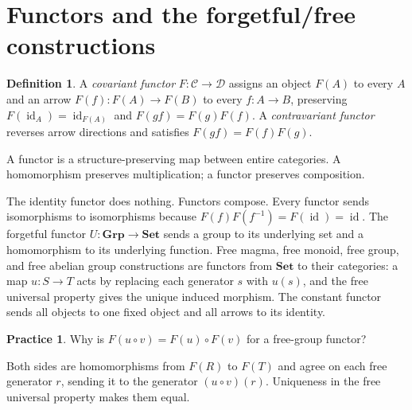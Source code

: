 \documentclass[11pt,openany]{book}
\newcommand{\id}{\operatorname{id}}\newcommand{\Sym}{\operatorname{Sym}}
\theoremstyle{definition}
\newtheorem{definition}[theorem]{Definition}
\newtheorem{exercise}[theorem]{Practice}
\begin{document}
\section{Functors and the forgetful/free constructions}
\begin{definition}A \emph{covariant functor} $F:\mathcal C\to\mathcal D$ assigns an object $F(A)$ to every $A$ and an arrow $F(f):F(A)\to F(B)$ to every $f:A\to B$, preserving $F(\id_A)=\id_{F(A)}$ and $F(gf)=F(g)F(f)$. A \emph{contravariant functor} reverses arrow directions and satisfies $F(gf)=F(f)F(g)$.\end{definition}
\begin{intuition}A functor is a structure-preserving map between entire categories. A homomorphism preserves multiplication; a functor preserves composition.\end{intuition}
The identity functor does nothing. Functors compose. Every functor sends isomorphisms to isomorphisms because $F(f)F(f^{-1})=F(\id)=\id$. The forgetful functor $U:\mathbf{Grp}\to\mathbf{Set}$ sends a group to its underlying set and a homomorphism to its underlying function. Free magma, free monoid, free group, and free abelian group constructions are functors from $\mathbf{Set}$ to their categories: a map $u:S\to T$ acts by replacing each generator $s$ with $u(s)$, and the free universal property gives the unique induced morphism. The constant functor sends all objects to one fixed object and all arrows to its identity.
\begin{exercise}Why is $F(u\circ v)=F(u)\circ F(v)$ for a free-group functor?\end{exercise}
\begin{solution}Both sides are homomorphisms from $F(R)$ to $F(T)$ and agree on each free generator $r$, sending it to the generator $(u\circ v)(r)$. Uniqueness in the free universal property makes them equal.\end{solution}
\end{document}
